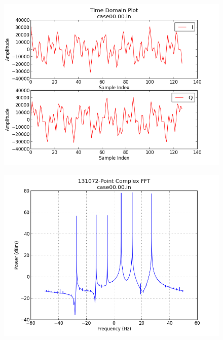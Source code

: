 \documentclass{article}
\begin{document}
	\begin{figure}[ht]
		\centering
		\begin{minipage}{.5\textwidth}
			\centering\includegraphics[width=1.0\linewidth]{input_time_tones}
			\label{fig:in_time_tone}
		\end{minipage}%
		\begin{minipage}{.5\textwidth}
			\centering\includegraphics[width=1.0\linewidth]{input_freq_tones}
			\label{fig:in_freq_tone}
		\end{minipage}
	\end{figure}
\end{document}

